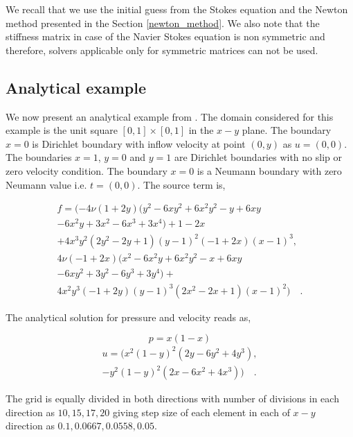 \documentclass[a4paper]{book}
\begin{document}
We recall that we use the initial guess from the Stokes equation and the Newton method presented in the Section  \ref{newton_method}. We also note that the stiffness matrix in case of the Navier Stokes equation is non symmetric and therefore, solvers applicable only for symmetric matrices can not be used. 

\subsection{Analytical example}

We now present an analytical example from \cite{Montlaur}. The domain considered for this example is the unit square $[0,1] \times [0,1]$ in the $x-y$ plane. 
The boundary ${x=0}$ is Dirichlet boundary with inflow velocity at point $(0,y)$ as $u = (0, 0)$. The boundaries ${x = 1}$, ${y = 0}$ and ${y = 1}$ are Dirichlet boundaries with no slip or zero velocity condition. The boundary ${x = 0}$ is a Neumann boundary with zero Neumann value i.e. $t = (0, 0)$. The source term is,

\begin{equation}
\begin{split}
f = (-4 \nu (1+2y) (y^2 - 6xy^2 + 6x^2 y^2 - y + 6xy \\ - 6x^2 y + 3x^2 - 6x^3 + 3x^4)+ 1 - 2x \\+ 4x^3 y^2 (2y^2 - 2y + 1)(y - 1)^2 (-1 + 2x)(x - 1)^3,\\ 4 \nu (-1 + 2x)(x^2 - 6x^2 y + 6x^2 y^2 - x + 6xy \\ - 6xy^2 + 3y^2 - 6y^3 + 3y^4) + \\ 4x^2y^3 (-1+2y)(y-1)^3 (2x^2-2x+1)(x-1)^2) \quad \textrm{.}
\end{split}
\end{equation}
 
The analytical solution for pressure and velocity reads as,

\begin{center}
\begin{equation}
p = x(1 - x)
\end{equation}
\begin{equation} 
\begin{split}
u = (x^2(1-y)^2(2y-6y^2+4y^3),\\-y^2(1-y)^2(2x-6x^2+4x^3)) \quad \textrm{.}
\end{split}
\end{equation}
\end{center}

The grid is equally divided in both directions with number of divisions in each direction as $10,15,17,20$ giving step size of each element in each of $x-y$ direction as $0.1,0.0667,0.0558,0.05$.\\
\end{document}
